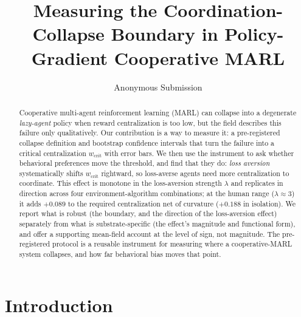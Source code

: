\documentclass[letterpaper]{article} %
\title{Measuring the Coordination-Collapse Boundary in Policy-Gradient Cooperative MARL}
\author{
  Anonymous Submission
}
\theoremstyle{plain}
\newcommand{\wcrit}{w_{\mathrm{crit}}}
\begin{document}
\maketitle

\begin{abstract}
Cooperative multi-agent reinforcement learning (MARL) can collapse into a degenerate
\emph{lazy-agent} policy when reward centralization is too low, but the field describes this
failure only qualitatively. Our contribution is a way to measure it: a pre-registered collapse
definition and bootstrap confidence intervals that turn the failure into a critical
centralization $\wcrit$ with error bars. We then use the instrument to ask whether behavioral preferences move the
threshold, and find that they do: \emph{loss aversion} systematically shifts $\wcrit$ rightward, so
loss-averse agents need more centralization to coordinate. This effect is monotone in the
loss-aversion strength $\lambda$ and replicates in direction across four environment-algorithm
combinations; at the human range ($\lambda\!\approx\!3$) it adds $+0.089$ to the required
centralization net of curvature ($+0.188$ in isolation). We report what is robust (the boundary, and the direction of the loss-aversion
effect) separately from what is substrate-specific (the effect's magnitude and functional form),
and offer a supporting mean-field account at the level of sign, not magnitude. The pre-registered
protocol is a reusable instrument for measuring where a cooperative-MARL system collapses, and how far
behavioral bias moves that point.
\end{abstract}

\section{Introduction}
\label{sec:intro}
\end{document}
